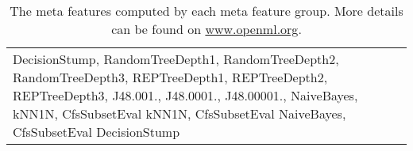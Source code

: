 \begin{table}[h]
{\begin{tabularx}{\textwidth}{>{\raggedright\arraybackslash}X}
	\multicolumn{1}{>{\centering\arraybackslash}X}{Landmarkers\footnotemark{}} \\ \hline
	DecisionStump, RandomTreeDepth1, RandomTreeDepth2, RandomTreeDepth3, REPTreeDepth1, REPTreeDepth2, REPTreeDepth3, J48.001., J48.0001., J48.00001., NaiveBayes, kNN1N, CfsSubsetEval kNN1N, CfsSubsetEval NaiveBayes, CfsSubsetEval DecisionStump \\ 
	\end{tabularx}
	}
	\caption{The meta features computed by each meta feature group. More details can be found on \href{www.openml.org}{www.openml.org}.}
	\label{tab:metaFeatureDetails}
\end{table}

